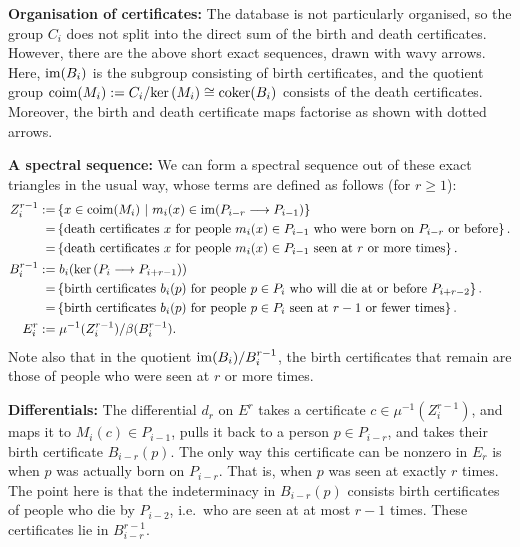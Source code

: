 \documentclass[11pt]{article}
\begin{document}
\begin{Births Deaths and Marriages}
\Bullet \textbf{Organisation of certificates:} The database is not particularly
organised, so the group $C_{i}$ does not split into the direct sum of the birth
and death certificates. However, there are the above short exact sequences,
drawn with wavy arrows. Here, $\operatorname{im}(B_{i})$ is the subgroup consisting of birth
certificates, and the quotient group
$\operatorname{coim}(M_{i}):=C_i/\textup{ker}\,(M_i)\cong\operatorname{coker}(B_i)$ consists of the death
certificates. Moreover, the birth and death certificate maps factorise as shown
with dotted arrows.

\Bullet \textbf{A spectral sequence:} We can form a spectral sequence out of
these exact triangles in the usual way, whose terms are defined as follows (for
$r\geq1$):
\begin{alignat*}{2}
Z_{i}^{r-1}:=&\left\{x\in \operatorname{coim}(M_i)\ \middle|\ m_i(x)\in\operatorname{im}(P_{i-r}\longrightarrow
P_{i-1})\right\}\\
=&\left\{\text{death certificates $x$ for people $m_i(x)\in P_{i-1}$ who were
born on $P_{i-r}$ or before}\right\}.\\
=&\left\{\text{death certificates $x$ for people $m_i(x)\in P_{i-1}$ seen at $r$
or more times}\right\}.\\
B_{i}^{r-1}:=&\left.b_i(\textup{ker}\,(P_i\longrightarrow P_{i+r-1}))\right.\\
=&\left\{\text{birth certificates $b_i(p)$ for people $p\in P_i$ who will die at
or before $P_{i+r-2}$}\right\}.\\
=&\left\{\text{birth certificates $b_i(p)$ for people $p\in P_i$ seen at $r-1$
or fewer times}\right\}.\\
E_{i}^{r}:=&\left.\mu^{-1}(Z_{i}^{r-1})/\beta(B_{i}^{r-1}).\right.
\end{alignat*}
Note also that in the quotient $\operatorname{im}(B_i)/B_i^{r-1}$, the birth certificates that
remain are those of people who were seen at $r$ or more times.

\Bullet \textbf{Differentials:} The differential $d_r$ on $E^{r}$ takes a
certificate $c\in\mu^{-1}(Z_i^{r-1})$, and maps it to $M_i(c)\in P_{i-1}$, pulls
it back to a person $p\in P_{i-r}$, and takes their birth certificate
$B_{i-r}(p)$. The only way this certificate can be nonzero in $E_r$ is when $p$
was actually born on $P_{i-r}$. That is, when $p$ was seen at exactly $r$ times.
The point here is that the indeterminacy in $B_{i-r}(p)$ consists birth
certificates of people who die by $P_{i-2}$, i.e.\ who are seen at at most $r-1$
times. These certificates lie in $B_{i-r}^{r-1}$.


\end{Births Deaths and Marriages}
\end{document}
